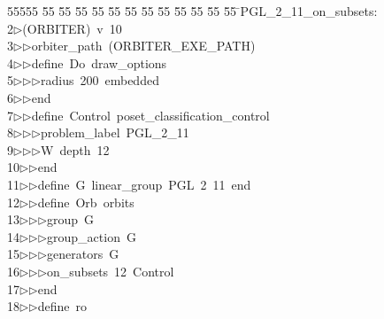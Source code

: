 %
%
\begin{tabbing}
55555 \= 55 \= 55 \= 55 \= 55 \= 55 \= 55 \= 55 \= 55 \= 55 \= 55 \= 55 \= 55 \= \>PGL\_2\_11\_on\_subsets:\\[0pt]
2\>$\triangleright$\>(ORBITER)\ v\ 10\ \\[0pt]
3\>$\triangleright$\>$\triangleright$\>orbiter\_path\ (ORBITER\_EXE\_PATH)\ \\[0pt]
4\>$\triangleright$\>$\triangleright$\>define\ Do\ draw\_options\ \\[0pt]
5\>$\triangleright$\>$\triangleright$\>$\triangleright$\>radius\ 200\ embedded\ \\[0pt]
6\>$\triangleright$\>$\triangleright$\>end\ \\[0pt]
7\>$\triangleright$\>$\triangleright$\>define\ Control\ poset\_classification\_control\ \\[0pt]
8\>$\triangleright$\>$\triangleright$\>$\triangleright$\>problem\_label\ PGL\_2\_11\ \\[0pt]
9\>$\triangleright$\>$\triangleright$\>$\triangleright$\>W\ depth\ 12\ \\[0pt]
10\>$\triangleright$\>$\triangleright$\>end\ \\[0pt]
11\>$\triangleright$\>$\triangleright$\>define\ G\ linear\_group\ PGL\ 2\ 11\ end\ \\[0pt]
12\>$\triangleright$\>$\triangleright$\>define\ Orb\ orbits\ \\[0pt]
13\>$\triangleright$\>$\triangleright$\>$\triangleright$\>group\ G\ \\[0pt]
14\>$\triangleright$\>$\triangleright$\>$\triangleright$\>group\_action\ G\ \\[0pt]
15\>$\triangleright$\>$\triangleright$\>$\triangleright$\>generators\ G\ \\[0pt]
16\>$\triangleright$\>$\triangleright$\>$\triangleright$\>on\_subsets\ 12\ Control\ \\[0pt]
17\>$\triangleright$\>$\triangleright$\>end\ \\[0pt]
18\>$\triangleright$\>$\triangleright$\>define\ ro\ \\[0pt]

\end{tabbing}
